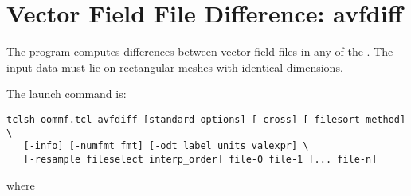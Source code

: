 
\section{Vector Field File Difference:
          avfdiff}\label{sec:avfdiff}%
%
The  program computes differences between vector field files
in any of the
\HTMLoutput{ (\OVF, \VIO)}.  The input data
must lie on rectangular meshes with identical dimensions.

The  launch command is:
\begin{verbatim}
tclsh oommf.tcl avfdiff [standard options] [-cross] [-filesort method] \
   [-info] [-numfmt fmt] [-odt label units valexpr] \
   [-resample fileselect interp_order] file-0 file-1 [... file-n]
\end{verbatim}
where

